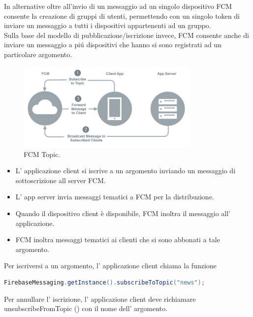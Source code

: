 In alternative oltre all'invio di un messaggio ad un singolo dispositivo FCM consente la creazione di gruppi di utenti, permettendo con un singolo token di inviare un messaggio a tutti i dispositivi appartenenti ad un gruppo.\\

Sulla base del modello di pubblicazione/iscrizione invece, FCM consente anche di inviare un messaggio a pi\'u dispositivi che hanno si sono registrati ad un particolare argomento.

\begin{figure}[!hb]
  \centering
  \includegraphics[width=0.8\textwidth]{immagini/fcm_topic.png}
  \caption{FCM Topic.}\label{fig:FCM Topic}
\end{figure}


    \begin{itemize}
        \item L' applicazione client si iscrive a un argomento inviando un messaggio di sottoscrizione all server FCM.
        \item L' app server invia messaggi tematici a FCM per la distribuzione.
        \item Quando il dispositivo client è disponibile, FCM inoltra il messaggio all' applicazione.
        \item     FCM inoltra messaggi tematici ai clienti che si sono abbonati a tale argomento.

    \end{itemize}




Per iscriversi a un argomento, l' applicazione client chiama la funzione

\begin{lstlisting}[language=java,caption={FCM topic}]
 FirebaseMessaging.getInstance().subscribeToTopic("news");
\end{lstlisting}

Per annullare l' iscrizione, l' applicazione client deve richiamare unsubscribeFromTopic () con il nome dell' argomento.





